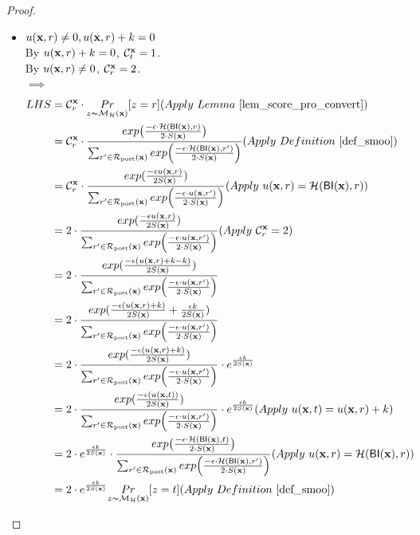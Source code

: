\documentclass{article}
\begin{document}
\begin{proof}
\begin{itemize}
  \item {\boldmath$u(\textbf{x}, {r}) \neq 0, u(\textbf{x}, {r}) + k = 0$} \\
      By $u(\textbf{x}, {r}) + k = 0$, $\mathcal{C}^{\textbf{x}}_{t} = 1$. \\
      By $u(\textbf{x}, {r}) \neq 0$, $\mathcal{C}^{\textbf{x}}_{r} = 2$.  \\
      $\implies$
      \begin{equation*}
      \begin{split}
      LHS   
      & = \cardinality{\dataobs}{r} \cdot \hexpmechPr{\dataobs}{z = r}     (Apply\ Lemma\ \ref{lem_score_pro_convert})\\
      & = \cardinality{\dataobs}{r} \cdot \frac {exp\big(\frac{-\epsilon\cdot\hellinger(\bysinfer(\dataobs),r)}{2\cdot S(\dataobs)}\big)}{\nomalizer{\dataobs}} 
      (Apply\ Definition\ \ref{def_smoo})\\
      & = \cardinality{\dataobs}{r} \cdot \frac{exp(\frac{-\epsilon \ux{r}}{2 S(\dataobs)})}{\unomalizer{\dataobs}}
      (Apply\ \ux{r} = \hellinger(\bysinfer(\dataobs), r))\\
      & = 2 \cdot \frac{exp(\frac{-\epsilon \ux{r}}{2 S(\dataobs)})}{\unomalizer{\dataobs}}                  (Apply \ \cardinality{\dataobs}{r} = 2)\\
      & = 2 \cdot \frac{exp(\frac{-\epsilon (\ux{r} + k - k)}{2 S(\dataobs)})}{\unomalizer{\dataobs}}\\
      & = 2 \cdot \frac{exp(\frac{-\epsilon (\ux{r} + k)}{2 S(\dataobs)} + \frac{\epsilon k}{2 S(\dataobs)})}{\unomalizer{\dataobs}}\\
      & = 2 \cdot \frac{exp(\frac{-\epsilon (\ux{r} + k)}{2 S(\dataobs)})}{\unomalizer{\dataobs}} \cdot e^{\frac{\epsilon k}{2 S(\dataobs)}}\\
      & = 2 \cdot \frac{exp(\frac{-\epsilon (\ux{t})}{2 S(\dataobs)})}{\unomalizer{\dataobs}} \cdot e^{\frac{\epsilon k}{2 S(\dataobs)}}  (Apply \ \ux{t} = \ux{r} + k)\\
      & = 2 \cdot e^{\frac{\epsilon k}{2 S(\dataobs)}} \cdot \frac {exp\big(\frac{-\epsilon\cdot\hellinger(\bysinfer(\dataobs), t)}{2\cdot S(\dataobs)}\big)}{\nomalizer{\dataobs}} 
      (Apply\ \ux{r} = \hellinger(\bysinfer(\dataobs), r))\\
      & = 2 \cdot e^{\frac{\epsilon k}{2 S(\dataobs)}} \hexpmechPr{\dataobs}{z = t}       (Apply\ Definition\ \ref{def_smoo})\\

\end{split}
\end{equation*}
\end{itemize}
\end{proof}
\end{document}
